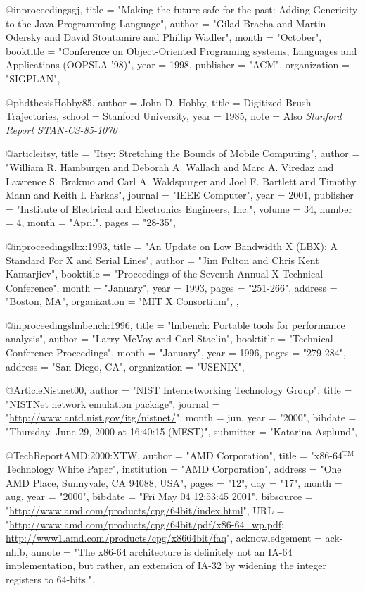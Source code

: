 @inproceedings{gj,
 title		= "Making the future safe for the past: Adding Genericity to the Java Programming Language",
 author		= "Gilad Bracha and Martin Odersky and David Stoutamire and Phillip Wadler",
 month		= "October",
 booktitle	= "Conference on Object-Oriented Programing systems, Languages and Applications (OOPSLA '98)",
 year		= 1998,
 publisher	= "ACM",
 organization	= "SIGPLAN",	}

@phdthesis{Hobby85,
 author = {John D. Hobby},
 title = {Digitized Brush Trajectories},
 school = {Stanford University},
 year = {1985},
 note = {Also {\it Stanford Report STAN-CS-85-1070}}
}

@article{itsy,
 title          = "{Itsy: Stretching the Bounds of Mobile Computing}",
 author         = "William R. Hamburgen and Deborah A. Wallach and Marc A. Viredaz and Lawrence S. Brakmo and Carl A. Waldspurger and Joel F. Bartlett and Timothy Mann and Keith I. Farkas",
 journal        = "IEEE Computer",
 year           = 2001,
 publisher      = "Institute of Electrical and Electronics Engineers, Inc.",
 volume         = 34,
 number         = 4,
 month          = "April",
 pages          = "28-35",              }
  
@inproceedings{lbx:1993,
 title = "{An Update on Low Bandwidth X (LBX): A Standard For X and Serial Lines}",
 author		= "Jim Fulton and Chris Kent Kantarjiev",
 booktitle	= "Proceedings of the Seventh Annual X Technical Conference",
 month		= "January",
 year		= 1993,
 pages		= "251-266",
 address	= "Boston, MA",
 organization	= "MIT X Consortium",	
},

@inproceedings{lmbench:1996,
 title 		= "{lmbench: Portable tools for performance analysis}",
 author		= "Larry McVoy and Carl Staelin",
 booktitle	= "Technical Conference Proceedings",
 month		= "January",
 year		= 1996,
 pages		= "279-284",
 address	= "San Diego, CA",
 organization	= "USENIX",		}
 
@Article{Nistnet00,
  author =       "NIST Internetworking Technology Group",
  title =        "{NISTNet} network emulation package",
  journal =      "\url{http://www.antd.nist.gov/itg/nistnet/}",
  month =        jun,
  year =         "2000",
  bibdate =      "Thursday, June 29, 2000 at 16:40:15 (MEST)",
  submitter =    "Katarina Asplund",
}

@TechReport{AMD:2000:XTW,
  author =       "{AMD Corporation}",
  title =        "{x86-64$^{\mathrm{TM}}$ Technology White Paper}",
  institution =  "{AMD Corporation}",
  address =      "One AMD Place, Sunnyvale, CA 94088, USA",
  pages =        "12",
  day =          "17",
  month =        aug,
  year =         "2000",
  bibdate =      "Fri May 04 12:53:45 2001",
  bibsource =    "\url{http://www.amd.com/products/cpg/64bit/index.html}",
  URL = "\url{http://www.amd.com/products/cpg/64bit/pdf/x86-64_wp.pdf};
                 \url{http://www1.amd.com/products/cpg/x8664bit/faq}",
  acknowledgement = ack-nhfb,
  annote =       "The x86-64 architecture is definitely not an IA-64
                 implementation, but rather, an extension of IA-32 by
                 widening the integer registers to 64-bits.",
}

